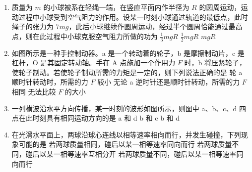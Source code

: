 \documentclass[\gkver]{gaokaozhenti}
\begin{document}
\begin{enumerate}

\item
质量为 $m$ 的小球被系在轻绳一端，在竖直平面内作半径为 $R$ 的圆周运动，运动过程中小球受到空气阻力的作用。设某一时刻小球通过轨道的最低点，此时绳子的张力为 $7mg$，此后小球继续作圆周运动，经过半个圆周恰能通过最高点，则在此过程中小球克服空气阻力所做的功为
{$\frac{1}{3}mgR$}
{$\frac{1}{2}mgR$}
{$mgR$}


\item
如图所示是一种手控制动器。a 是一个转动着的轮子，b 是摩擦制动片，c 是杠杆，O 是其固定转动轴。手在 A 点施加一个作用力 $F$ 时，b 将压紧轮子，使轮子制动。若使轮子制动所需的力矩是一定的，则下列说法正确的是
\onepicture[h=6.41cm]{}
{轮 a 顺时针转动时，所需的力 $F$ 较小}
{无论 a 逆时针还是顺时针转动，所需的力 $F$ 相同}
{无法比较 $F$ 的大小}


\item
一列横波沿水平方向传播，某一时刻的波形如图所示，则图中 a、b、c、d 四点在此时刻具有相同运动方向的是
\onepicture[w=5.19cm]{}
{a 和 d}
{b 和 c}
{b 和 d}


\item
在光滑水平面上，两球沿球心连线以相等速率相向而行，并发生碰撞，下列现象可能的是
{若两球质量相同，碰后以某一相等速率同向而行}
{若两球质量不同，碰后以某一相等速率互相分开}
{若两球质量不同，碰后以某一相等速率同向而行}


\end{enumerate}
\end{document}
